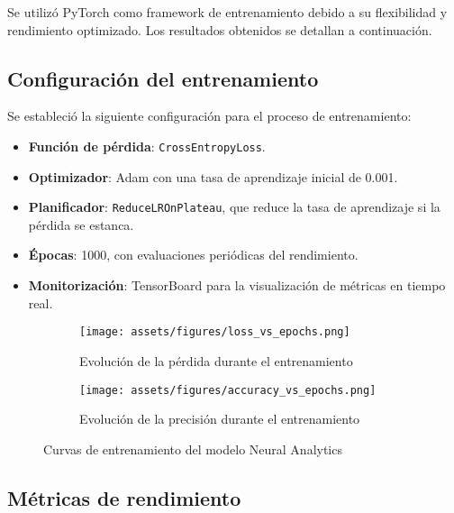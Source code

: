 Se utilizó PyTorch como framework de entrenamiento debido a su flexibilidad y rendimiento optimizado. Los resultados obtenidos se detallan a continuación.

\subsection{Configuración del entrenamiento}

Se estableció la siguiente configuración para el proceso de entrenamiento:

\begin{itemize}
    \item \textbf{Función de pérdida}: \texttt{CrossEntropyLoss}.
    
    \item \textbf{Optimizador}: Adam con una tasa de aprendizaje inicial de 0.001.
    
    \item \textbf{Planificador}: \texttt{ReduceLROnPlateau}, que reduce la tasa de aprendizaje si la pérdida se estanca.
    
    \item \textbf{Épocas}: 1000, con evaluaciones periódicas del rendimiento.
    
    \item \textbf{Monitorización}: TensorBoard para la visualización de métricas en tiempo real.
\end{itemize}

\begin{figure}[ht]
    \centering
    \begin{subfigure}[b]{0.49\textwidth}
        \centering
        \texttt{[image: assets/figures/loss\_vs\_epochs.png]}
        \caption{Evolución de la pérdida durante el entrenamiento}
        \label{fig:loss_vs_epochs}
    \end{subfigure}
    \hfill
    \begin{subfigure}[b]{0.49\textwidth}
        \centering
        \texttt{[image: assets/figures/accuracy\_vs\_epochs.png]}
        \caption{Evolución de la precisión durante el entrenamiento}
        \label{fig:accuracy_vs_epochs}
    \end{subfigure}
    \caption{Curvas de entrenamiento del modelo Neural Analytics}
    \label{fig:training_curves}
\end{figure}

\newpage
\subsection{Métricas de rendimiento}

